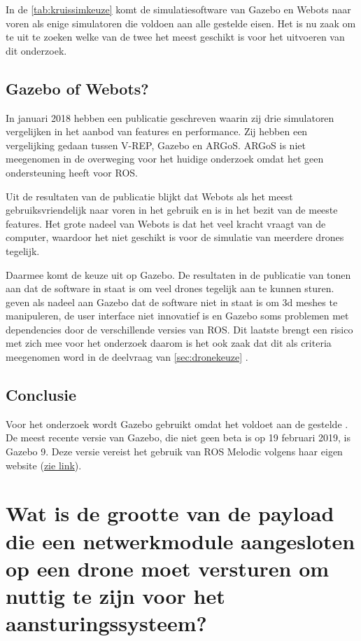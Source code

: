 \documentclass[a4paper, 11pt, oneside]{report}
\begin{document}
In de \autoref{tab:kruissimkeuze} komt de simulatiesoftware van Gazebo en Webots naar voren als enige simulatoren die voldoen aan alle gestelde eisen.
Het is nu zaak om te uit te zoeken welke van de twee het meest geschikt is voor het uitvoeren van dit onderzoek.

\subsection{Gazebo of Webots?}
In januari 2018 hebben \citeauthor{RobotCompare} een publicatie geschreven waarin zij drie simulatoren vergelijken in het aanbod van features en performance\cite{RobotCompare}. 
Zij hebben een vergelijking gedaan tussen V-REP, Gazebo en ARGoS. 
ARGoS is niet meegenomen in de overweging voor het huidige onderzoek omdat het geen ondersteuning heeft voor ROS.

Uit de resultaten van de publicatie blijkt dat Webots als het meest gebruiksvriendelijk naar voren in het gebruik en is in het bezit van de meeste features.
Het grote nadeel van Webots is dat het veel kracht vraagt van de computer, waardoor het niet geschikt is voor de simulatie van meerdere drones tegelijk.

Daarmee komt de keuze uit op Gazebo. 
De resultaten in de publicatie van  tonen aan dat de software in staat is om veel drones tegelijk aan te kunnen sturen.
 geven als nadeel aan Gazebo dat de software niet in staat is om 3d meshes te manipuleren, de user interface niet innovatief is en Gazebo soms problemen met dependencies door de verschillende versies van ROS.
Dit laatste brengt een risico met zich mee voor het onderzoek daarom is het ook zaak dat dit als criteria meegenomen word in de deelvraag van \autoref{sec:dronekeuze} . 

\subsection{Conclusie}
Voor het onderzoek wordt Gazebo gebruikt omdat het voldoet aan de gestelde .
De meest recente versie van Gazebo, die niet geen beta is op 19 februari 2019, is Gazebo 9.
Deze versie vereist het gebruik van ROS Melodic volgens haar eigen website  (\href{http://gazebosim.org/tutorials?tut=ros_wrapper_versions}{zie link}).

\section[Welke grootte voor de payload?]{Wat is de grootte van de payload die een netwerkmodule aangesloten op een drone moet versturen om nuttig te zijn voor het aansturingssysteem?}
\end{document}
